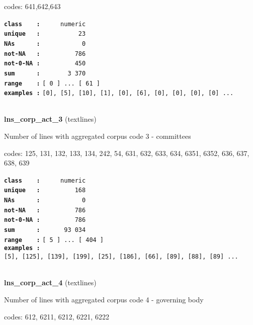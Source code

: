 \documentclass[]{article}
\begin{document}
codes: 641,642,643

\textbf{\texttt{class\ \ \ \ :}} \texttt{~~~~~numeric}\\
\textbf{\texttt{unique\ \ \ :}} \texttt{~~~~~~~~~~23}\\
\textbf{\texttt{NAs\ \ \ \ \ \ :}} \texttt{~~~~~~~~~~~0}\\
\textbf{\texttt{not-NA\ \ \ :}} \texttt{~~~~~~~~~786}\\
\textbf{\texttt{not-0-NA\ :}} \texttt{~~~~~~~~~450}\\
\textbf{\texttt{sum\ \ \ \ \ \ :}} \texttt{~~~~~~~3~370}\\
\textbf{\texttt{range\ \ \ \ :}}
\texttt{{[}\ 0\ {]}\ ...\ {[}\ 61\ {]}}\\
\textbf{\texttt{examples\ :}}
\texttt{{[}0{]},\ {[}5{]},\ {[}10{]},\ {[}1{]},\ {[}0{]},\ {[}6{]},\ {[}0{]},\ {[}0{]},\ {[}0{]},\ {[}0{]}\ ...}\\

~

\textbf{lns\_corp\_act\_3} (textlines)

Number of lines with aggregated corpus code 3 - committees

codes: 125, 131, 132, 133, 134, 242, 54, 631, 632, 633, 634, 6351, 6352,
636, 637, 638, 639

\textbf{\texttt{class\ \ \ \ :}} \texttt{~~~~~numeric}\\
\textbf{\texttt{unique\ \ \ :}} \texttt{~~~~~~~~~168}\\
\textbf{\texttt{NAs\ \ \ \ \ \ :}} \texttt{~~~~~~~~~~~0}\\
\textbf{\texttt{not-NA\ \ \ :}} \texttt{~~~~~~~~~786}\\
\textbf{\texttt{not-0-NA\ :}} \texttt{~~~~~~~~~786}\\
\textbf{\texttt{sum\ \ \ \ \ \ :}} \texttt{~~~~~~93~034}\\
\textbf{\texttt{range\ \ \ \ :}}
\texttt{{[}\ 5\ {]}\ ...\ {[}\ 404\ {]}}\\
\textbf{\texttt{examples\ :}}
\texttt{{[}5{]},\ {[}125{]},\ {[}139{]},\ {[}199{]},\ {[}25{]},\ {[}186{]},\ {[}66{]},\ {[}89{]},\ {[}88{]},\ {[}89{]}\ ...}\\

~

\textbf{lns\_corp\_act\_4} (textlines)

Number of lines with aggregated corpus code 4 - governing body

codes: 612, 6211, 6212, 6221, 6222
\end{document}
